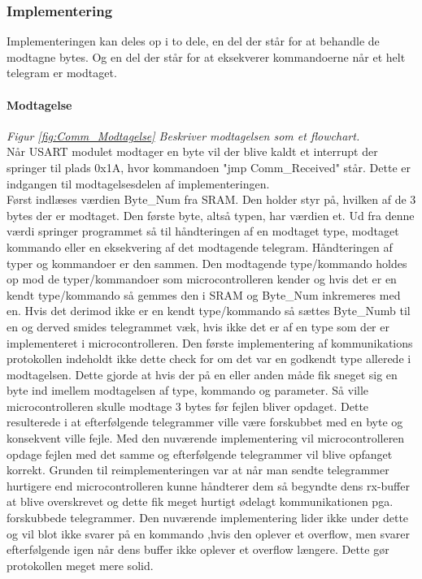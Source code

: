 \subsubsection{Implementering}
Implementeringen kan deles op i to dele, en del der står for at behandle de modtagne bytes. Og en del der står for at eksekverer kommandoerne når et helt telegram er modtaget. 

\paragraph{Modtagelse}
\textit{Figur \ref{fig:Comm_Modtagelse} Beskriver modtagelsen som et flowchart.} \\

Når USART modulet modtager en byte vil der blive kaldt et interrupt der springer til plads 0x1A, hvor kommandoen "jmp Comm\_Received" står. Dette er indgangen til modtagelsesdelen af implementeringen. \\
Først indlæses værdien Byte\_Num fra SRAM. Den holder styr på, hvilken af de 3 bytes der er modtaget. Den første byte, altså typen, har værdien et. Ud fra denne værdi springer programmet så til håndteringen af en modtaget type, modtaget kommando eller en eksekvering af det modtagende telegram. Håndteringen af typer og kommandoer er den sammen. Den modtagende type/kommando holdes op mod de typer/kommandoer som microcontrolleren kender og hvis det er en kendt type/kommando så gemmes den i SRAM og Byte\_Num inkremeres med en. Hvis det derimod ikke er en kendt type/kommando så sættes Byte\_Numb til en og derved smides telegrammet væk, hvis ikke det er af en type som der er implementeret i microcontrolleren. Den første implementering af kommunikations protokollen indeholdt ikke dette check for om det var en godkendt type allerede i modtagelsen. Dette gjorde at hvis der på en eller anden måde fik sneget sig en byte ind imellem modtagelsen af type, kommando og parameter. Så ville microcontrolleren skulle modtage 3 bytes før fejlen bliver opdaget. Dette resulterede i at efterfølgende telegrammer ville være forskubbet med en byte og konsekvent ville fejle. Med den nuværende implementering vil microcontrolleren opdage fejlen med det samme og efterfølgende telegrammer vil blive opfanget korrekt. Grunden til reimplementeringen var at når man sendte telegrammer hurtigere end microcontrolleren kunne håndterer dem så begyndte dens rx-buffer at blive overskrevet og dette fik meget hurtigt ødelagt kommunikationen pga. forskubbede telegrammer. Den nuværende implementering lider ikke under dette og vil blot ikke svarer på en kommando ,hvis den oplever et overflow, men svarer efterfølgende igen når dens buffer ikke oplever et overflow længere. Dette gør protokollen meget mere solid.

